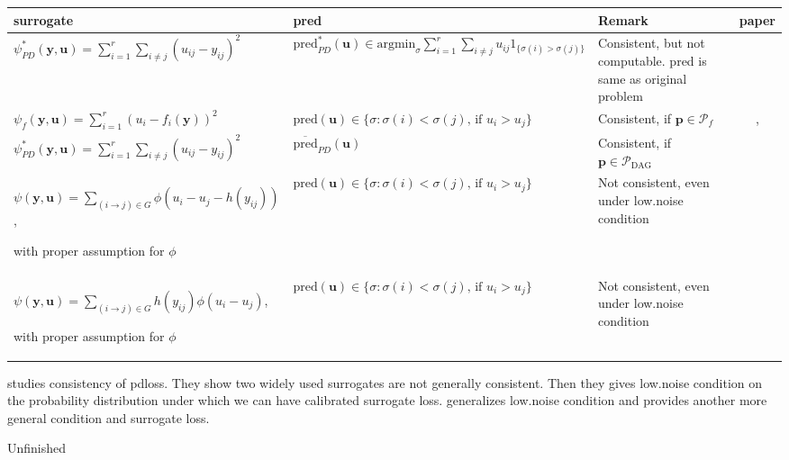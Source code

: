 \begin{center}
	\footnotesize
	\begin{tabular}{ | p{5.1cm} | p{5.9cm} | p{3cm} |c|}
		\hline
		surrogate & pred & Remark&paper\\ \hline
		$\psi^*_{PD}(\mathbf{y}, \mathbf{u})=\sum\limits_{i=1}^r\sum\limits_{i\not=j}(u_{ij}-y_{ij})^2$ &$\text{pred}^*_{PD}(\mathbf{u})\in\text{argmin}_{\sigma}\sum\limits_{i=1}^r\sum\limits_{i\not=j}u_{ij}1_{\{\sigma(i)>\sigma(j)\}}$ & Consistent, but not computable. pred is same as original problem& \cite{ramaswamy2013convex}
		\\ \hline
		$\psi_f(\mathbf{y}, \mathbf{u})=\sum\limits_{i=1}^r(u_i-f_i(\mathbf{y}))^2$ & $\text{pred}(\mathbf{u})\in\{\sigma: \sigma(i)<\sigma(j) \text{, if }u_i>u_j\}$  & Consistent, if $\mathbf{p}\in \mathcal{P}_{f}$ &\cite{ramaswamy2013convex}, \cite{duchi2010ranking}\\
		\hline
		$\psi^*_{PD}(\mathbf{y}, \mathbf{u})=\sum\limits_{i=1}^r\sum\limits_{i\not=j}(u_{ij}-y_{ij})^2$ & $\overline{\text{pred}}_{PD}(\mathbf{u})$  & Consistent, if $\mathbf{p}\in \mathcal{P}_{\text{DAG}}$ &\cite{ramaswamy2013convex}\\
		\hline
		$\psi(\mathbf{y}, \mathbf{u})=\sum\limits_{(i\rightarrow j)\in G}\phi(u_{i}-u_{j}-h(y_{ij}))$,
		
		with proper assumption for $\phi$ & $\text{pred}(\mathbf{u})\in\{\sigma: \sigma(i)<\sigma(j) \text{, if }u_i>u_j\}$  & Not consistent, even under low.noise condition&\cite{duchi2010ranking}\\
		\hline
		$\psi(\mathbf{y}, \mathbf{u})=\sum\limits_{(i\rightarrow j)\in G}h(y_{ij})\phi(u_{i}-u_{j})$,
		
		with proper assumption for $\phi$& $\text{pred}(\mathbf{u})\in\{\sigma: \sigma(i)<\sigma(j) \text{, if }u_i>u_j\}$  & Not consistent, even under low.noise condition &\cite{duchi2010ranking} \\
		\hline
	\end{tabular}
\end{center}


\cite{duchi2010ranking} studies consistency of pdloss. They show two widely used surrogates are not generally consistent. Then they gives low.noise condition on the probability distribution under which we can have calibrated surrogate loss. \cite{ramaswamy2013convex} generalizes low.noise condition and provides another more general condition and surrogate loss. 

Unfinished

